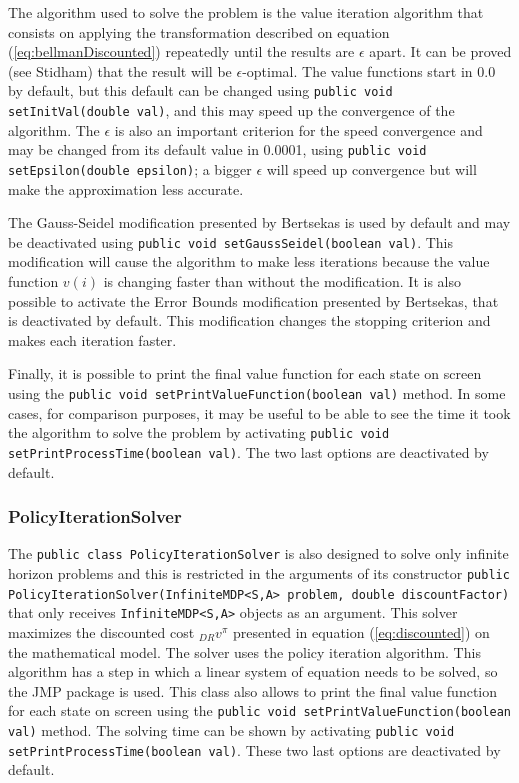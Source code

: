 \documentclass[11pt]{article}
\begin{document}
The algorithm used to solve the problem is the value iteration algorithm that consists on applying the transformation described on equation (\ref{eq:bellmanDiscounted}) repeatedly until the results are $\epsilon$ apart. It can be proved (see Stidham\cite{stidham}) that the result will be $\epsilon$-optimal. The value functions start in 0.0 by default, but this default can be changed using \lstinline!public void setInitVal(double val)!, and this may speed up the convergence of the algorithm. The $\epsilon$ is also an important criterion for the speed convergence and may be changed from its default value in 0.0001, using \lstinline!public void setEpsilon(double epsilon)!; a bigger $\epsilon$ will speed up convergence but will make the approximation less accurate.

The Gauss-Seidel modification presented by Bertsekas\cite{bertsekas} is used by default and may be deactivated using \lstinline!public void setGaussSeidel(boolean val)!. This modification will cause the algorithm to make less iterations because the value function $v(i)$ is changing faster than without the modification. It is also possible to activate the Error Bounds modification presented by Bertsekas\cite{bertsekas}, that is deactivated by default. This modification changes the stopping criterion and makes each iteration faster.

Finally, it is possible to  print the final value function for each state on screen using the \lstinline!public void setPrintValueFunction(boolean val)! method. In some cases, for comparison purposes, it may be useful to be able to see the time it took the algorithm to solve the problem by activating \lstinline!public void setPrintProcessTime(boolean val)!. The two last options are deactivated by default.


\subsubsection{PolicyIterationSolver}

The \lstinline!public class PolicyIterationSolver! is also designed to solve only infinite horizon problems and this is restricted in the arguments of its constructor \lstinline!public PolicyIterationSolver(InfiniteMDP<S,A> problem, double discountFactor)! that only receives \lstinline!InfiniteMDP<S,A>! objects as an argument. This solver maximizes the discounted cost ${}_{DR}v^{\pi}$ presented in equation (\ref{eq:discounted}) on the mathematical model.
The solver uses the policy iteration algorithm. This algorithm has a step in which a linear system of equation needs to be solved, so the JMP\cite{bjorn} package is used. This class also allows to print the final value function for each state on screen using the \lstinline!public void setPrintValueFunction(boolean val)! method. The solving time can be shown by activating \lstinline!public void setPrintProcessTime(boolean val)!. These two last options are deactivated by default.
\end{document}
